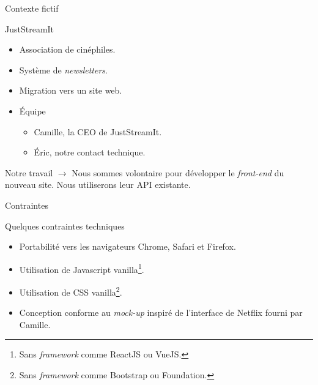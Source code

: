 \begin{frame}{Contexte fictif}
  \begin{block}{JustStreamIt}
    \begin{itemize}
    \item Association de cinéphiles.
    \item Système de \textit{newsletters}.
    \item Migration vers un site web.
    \item Équipe
      \begin{itemize}
      \item Camille, la CEO de JustStreamIt.
      \item Éric, notre contact technique.
      \end{itemize}
    \end{itemize}
  \end{block}
  
  \begin{block}{Notre travail}
    $\rightarrow$ Nous sommes volontaire pour développer le
    \textit{front-end} du nouveau site. Nous utiliserons leur API existante.
  \end{block}
\end{frame}

\begin{frame}{Contraintes}
  \begin{block}{Quelques contraintes techniques}
    \begin{itemize}
    \item Portabilité vers les navigateurs Chrome, Safari et Firefox.
    \item Utilisation de Javascript vanilla\footnote{Sans \textit{framework} comme ReactJS ou VueJS.}.
    \item Utilisation de CSS vanilla\footnote{Sans \textit{framework} comme Bootstrap ou Foundation.}.
    \item Conception conforme au \textit{mock-up} inspiré de
      l'interface de Netflix fourni par Camille.
    \end{itemize}
  \end{block}
\end{frame}
